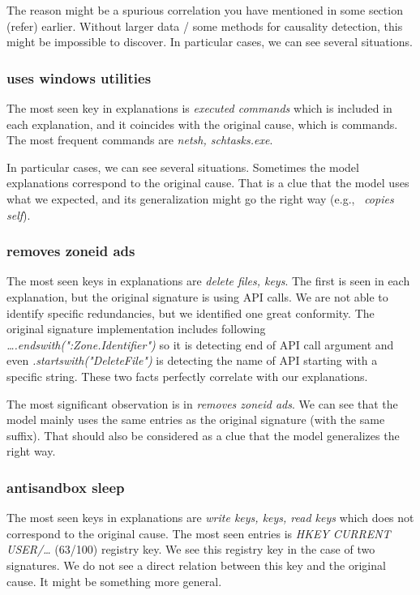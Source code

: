 The reason might be a spurious correlation you have mentioned in some section (refer) earlier. Without larger data / some methods for causality detection, this might be impossible to discover. In particular cases, we can see several situations. 

\subsubsection*{uses windows utilities}
The most seen key in explanations is \emph{executed commands} which is included in each explanation, and it coincides with the original cause, which is commands. The most frequent commands are \emph{netsh, schtasks.exe}.

In particular cases, we can see several situations. Sometimes the model explanations correspond to the original cause. That is a clue that the model uses what we expected, and its generalization might go the right way (e.g., \ \emph{copies self}).

\subsubsection*{removes zoneid ads}
The most seen keys in explanations are \emph{delete files, keys}. The first is seen in each explanation, but the original signature is using API calls. We are not able to identify specific redundancies, but we identified one great conformity. The original signature implementation includes following \emph{\dots .endswith(":Zone.Identifier")} so it is detecting end of API call argument and even \emph{.startswith("DeleteFile")} is detecting the name of API starting with a specific string. These two facts perfectly correlate with our explanations.

The most significant observation is in \emph{removes zoneid ads}. We can see that the model mainly uses the same entries as the original signature (with the same suffix). That should also be considered as a clue that the model generalizes the right way.

\subsubsection*{antisandbox sleep}
The most seen keys in explanations are \emph{write keys, keys, read keys} which does not correspond to the original cause. The most seen entries is \emph{HKEY CURRENT USER/\dots} (63/100) registry key. We see this registry key in the case of two signatures. We do not see a direct relation between this key and the original cause. It might be something more general.

